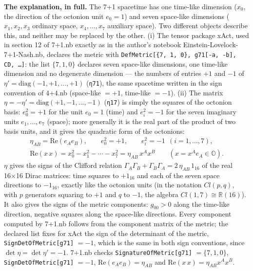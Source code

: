 \documentclass[10pt,a4paper]{article}
\begin{document}
\textbf{The explanation, in full.} The 7+1 spacetime has one time-like dimension ($x_0$, the direction of the octonion unit $e_0=1$) and seven space-like dimensions ($x_1,x_2,x_3$ ordinary space, $x_4,\dots,x_7$ auxiliary space). Two different objects describe this, and neither may be replaced by the other. (i) The tensor package xAct, used in section 12 of 7+1.nb exactly as in the author’s notebook Einstein-Lovelock-7+1-Nash.nb, declares the metric with \texttt{DefMetric[\{7, 1, 0\}, g71[-a, -b], CD, …]}: the list $\{7,1,0\}$ declares seven space-like dimensions, one time-like dimension and no degenerate dimension — the numbers of entries $+1$ and $-1$ of $\eta'=\mathrm{diag}(-1,+1,\dots,+1)$ (\texttt{η71}), the same spacetime written in the sign convention of 4+4.nb (space-like $=+1$, time-like $=-1$). (ii) The matrix $\eta=-\eta'=\mathrm{diag}(+1,-1,\dots,-1)$ (\texttt{η17}) is simply the squares of the octonion basis: $e_0^2=+1$ for the unit $e_0=1$ (time) and $e_i^2=-1$ for the seven imaginary units $e_1,\dots,e_7$ (space); more generally it is the real part of the product of two basis units, and it gives the quadratic form of the octonions:
\begin{gather*}
\eta_{AB}=\mathrm{Re}(e_Ae_B),\qquad e_0^2=+1,\qquad e_i^2=-1\ \ (i=1,\dots,7),\\ \mathrm{Re}(x\,x)=x_0^2-x_1^2-\cdots-x_7^2=\eta_{AB}\,x^Ax^B\qquad (x=x^Ae_A\in\mathbb O).
\end{gather*}
$\eta$ gives the signs of the Clifford relation $\Gamma_A\Gamma_B+\Gamma_B\Gamma_A=2\,\eta_{AB}\,1_{16}$ of the real 16×16 Dirac matrices: time squares to $+1_{16}$ and each of the seven space directions to $-1_{16}$, exactly like the octonion units (in the notation $Cl(p,q)$, with $p$ generators squaring to $+1$ and $q$ to $-1$, the algebra $Cl(1,7)\cong\mathbb R(16)$). It also gives the signs of the metric components: $g_{00}>0$ along the time-like direction, negative squares along the space-like directions. Every component computed by 7+1.nb follows from the component matrix of the metric; the declared list fixes for xAct the sign of the determinant of the metric, \texttt{SignDetOfMetric[g71]} $=-1$, which is the same in both sign conventions, since $\det \eta=\det \eta'=-1$. 7+1.nb checks \texttt{SignatureOfMetric[g71]} $=\{7,1,0\}$, \texttt{SignDetOfMetric[g71]} $=-1$, $\mathrm{Re}(e_Ae_B)=\eta_{AB}$ and $\mathrm{Re}(x\,x)=\eta_{AB}x^Ax^B$.
\end{document}
